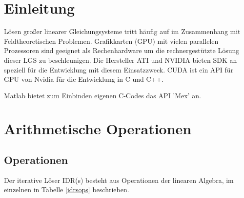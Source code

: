 \documentclass[journal]{IEEEtran}
\begin{document}
\section{Einleitung}
%
%
%
%
 Lösen großer linearer Gleichungsysteme tritt häufig auf im Zusammenhang
mit Feldtheoretischen Problemen.
Grafikkarten (GPU) mit vielen parallelen Prozessoren
sind geeignet als Rechenhardware um die rechnergestützte Lösung dieser LGS zu beschleunigen.
Die Hersteller ATI und NVIDIA bieten SDK an speziell für die Entwicklung mit
diesem Einsatzzweck. CUDA \cite{cudapg} ist ein API für GPU von Nvidia für die Entwicklung in C und C++.
\par Matlab bietet zum Einbinden eigenen C-Codes das API 'Mex' an.

\section{Arithmetische Operationen}


\subsection{Operationen}

Der iterative Löser IDR(s) \cite{idrs} besteht aus Operationen \cite{idrsm}
der linearen Algebra, im einzelnen in Tabelle \ref{idrsops} beschrieben.
\end{document}
